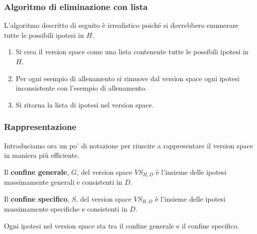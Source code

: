 \subsubsection{Algoritmo di eliminazione con lista}
L'algoritmo descritto di seguito \`e irrealistico poich\'e si dovrebbero enumerare tutte le possibili ipotesi in $H$.
\begin{enumerate}
	\item Si crea il version space come una lista contenente tutte le possibili ipotesi in $H$.
	\item Per ogni esempio di allenamento si rimuove dal version space ogni ipotesi inconsistente con l'esempio
	      di allenamento.
	\item Si ritorna la lista di ipotesi nel version space.
\end{enumerate}

\subsubsection{Rappresentazione}
Introduciamo ora un po' di notazione per riuscire a rappresentare il version space in maniera pi\`u efficiente.

\begin{definition}
	Il \textbf{confine generale}, $G$, del version space $VS_{H, D}$ \`e l'insieme delle ipotesi massimamente generali
	e consistenti in $D$.
\end{definition}

\begin{definition}
	Il \textbf{confine specifico}, $S$, del version space $VS_{H, D}$ \`e l'insieme delle ipotesi massimamente specifiche
	e consistenti in $D$.
\end{definition}

\begin{theorem}
	Ogni ipotesi nel version space sta tra il confine generale e il confine specifico.
\end{theorem}

